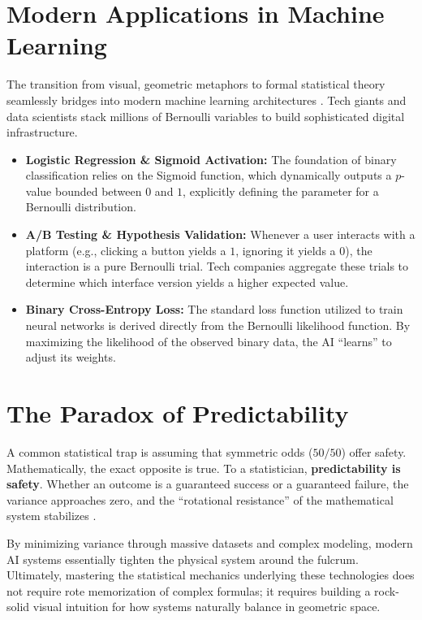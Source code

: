 \documentclass[12pt]{article}
\newcommand{\purplehighlight}[1]{\textcolor{purplehl}{\textbf{#1}}}
\begin{document}
\section{Modern Applications in Machine Learning}
The transition from visual, geometric metaphors to formal statistical theory seamlessly bridges into modern machine learning architectures \cite{goodfellow2016}. Tech giants and data scientists stack millions of Bernoulli variables to build sophisticated digital infrastructure.

\begin{itemize}
    \item \purplehighlight{Logistic Regression \& Sigmoid Activation:} The foundation of binary classification relies on the Sigmoid function, which dynamically outputs a $p$-value bounded between $0$ and $1$, explicitly defining the parameter for a Bernoulli distribution.
    \item \purplehighlight{A/B Testing \& Hypothesis Validation:} Whenever a user interacts with a platform (e.g., clicking a button yields a $1$, ignoring it yields a $0$), the interaction is a pure Bernoulli trial. Tech companies aggregate these trials to determine which interface version yields a higher expected value.
    \item \purplehighlight{Binary Cross-Entropy Loss:} The standard loss function utilized to train neural networks is derived directly from the Bernoulli likelihood function. By maximizing the likelihood of the observed binary data, the AI ``learns'' to adjust its weights.
\end{itemize}

\section{The Paradox of Predictability}
A common statistical trap is assuming that symmetric odds ($50/50$) offer safety. Mathematically, the exact opposite is true. To a statistician, \purplehighlight{predictability is safety}. Whether an outcome is a guaranteed success or a guaranteed failure, the variance approaches zero, and the ``rotational resistance'' of the mathematical system stabilizes \cite{shannon1948}.

By minimizing variance through massive datasets and complex modeling, modern AI systems essentially tighten the physical system around the fulcrum. Ultimately, mastering the statistical mechanics underlying these technologies does not require rote memorization of complex formulas; it requires building a rock-solid visual intuition for how systems naturally balance in geometric space.
\end{document}

